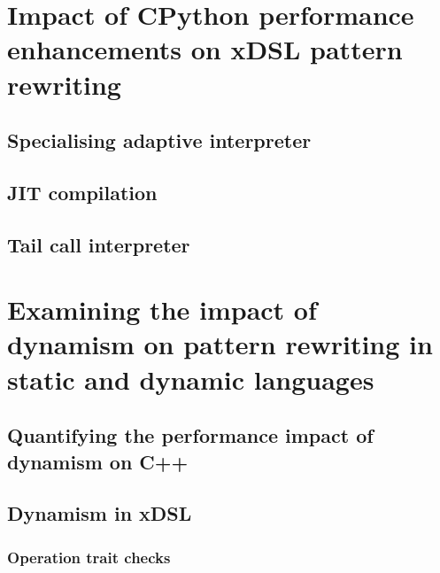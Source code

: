 \chapter{Impact of CPython performance enhancements on xDSL pattern rewriting}

\section{Specialising adaptive interpreter}
\section{JIT compilation}
\section{Tail call interpreter}









\chapter{Examining the impact of dynamism on pattern rewriting in static and dynamic languages}
\label{chap:dynamism-pattern-rewriting}

\section{Quantifying the performance impact of dynamism on C++}

\section{Dynamism in xDSL}

\subsection{Operation trait checks}

